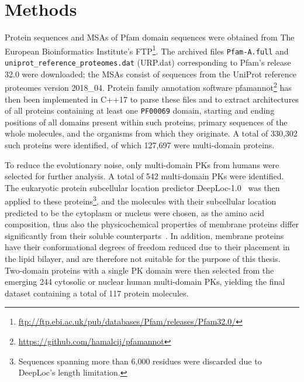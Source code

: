 \chapter{Methods}
\label{methods}

Protein sequences and MSAs of Pfam domain sequences were obtained from The European
Bioinformatics Institute's
FTP\footnote{\url{ftp://ftp.ebi.ac.uk/pub/databases/Pfam/releases/Pfam32.0/}}.
The archived files \texttt{Pfam-A.full} and \texttt{uniprot\_reference\_proteomes.dat}
(URP.dat) corresponding to Pfam's release 32.0 were downloaded; the MSAs consist of
sequences from the UniProt reference proteomes version 2018\_04.
Protein family annotation software
pfamannot\footnote{\url{https://github.com/hamalcij/pfamannot}} has then been implemented
in C++17 to parse these files and to extract architectures of all proteins containing at
least one \texttt{PF00069} domain, starting and ending positions of all domains present
within such proteins, primary sequences of the whole molecules, and the organisms from
which they originate.
A total of 330,302 such proteins were identified, of which 127,697 were multi-domain
proteins.

To reduce the evolutionary noise, only multi-domain PKs from humans were selected for
further analysis.
A total of 542 multi-domain PKs were identified.
The eukaryotic protein subcellular location predictor
DeepLoc-1.0~\cite{almagro2017deeploc} was then applied to these
proteins\footnote{Sequences spanning more than 6,000 residues were discarded due to
DeepLoc's length limitation.}, and the molecules with their subcellular location
predicted to be the cytoplasm or nucleus were chosen, as the amino acid composition, thus
also the physicochemical properties of membrane proteins differ significantly from their
soluble counterparts~\cite{capaldi1972low, von1988topogenic, tusnady1998principles}.
In addition, membrane proteins have their conformational degrees of freedom reduced due to
their placement in the lipid bilayer, and are therefore not suitable for the purpose of
this thesis.
Two-domain proteins with a single PK domain were then selected from the emerging 244
cytosolic or nuclear human multi-domain PKs, yielding the final dataset containing a
total of 117 protein molecules.

